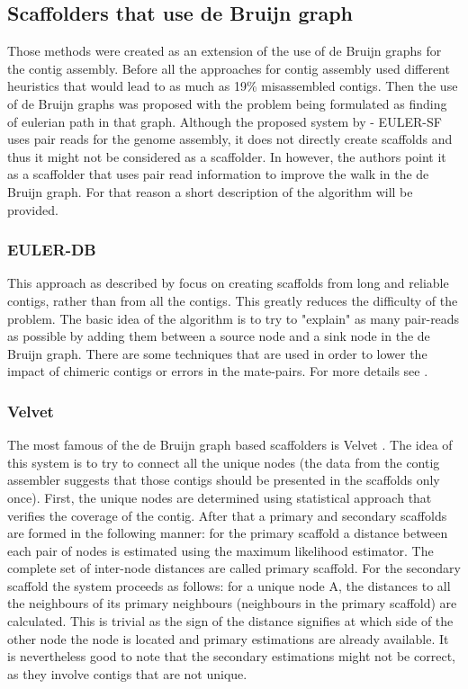 \documentclass[11pt]{article}
\begin{document}
\subsection{Scaffolders that use de Bruijn graph} %
\label{sub:Scaffolders that use de Bruijn graph}
Those methods were created as an extension of the use of de Bruijn graphs for
the contig assembly. Before \cite{pevzner} all the approaches for contig
assembly used different heuristics that would lead to as much as 19\%
misassembled contigs. Then the use of de Bruijn graphs was proposed with
the problem being formulated as finding of eulerian path in that graph. Although
the proposed system by \cite{pevzner} - EULER-SF uses pair reads for the genome
assembly, it does not directly create scaffolds and thus it might not be
considered as a scaffolder. In \cite{SOPRA} however, the authors point it as a
scaffolder that uses pair read information to improve the walk in the de Bruijn
graph. For that reason a short description of the algorithm will be provided.

\subsubsection{EULER-DB} %
\label{ssub:EULER-DB}
This approach as described by \cite{pevzner} focus on creating scaffolds from
long and reliable contigs, rather than from all the contigs. This greatly
reduces the difficulty of the problem. The basic idea of the algorithm is to try
to "explain" as many pair-reads as possible by adding them between a source node
and a sink node in the de Bruijn graph. There are some techniques that are used
in order to lower the impact of chimeric contigs or errors in the mate-pairs.
For more details see \cite{pevzner}.


\subsubsection{Velvet} %
\label{ssub:Velvet}
The most famous of the de Bruijn graph based scaffolders is Velvet
\cite{velvet-scaffolding}. The idea of this system is to try to connect all the
unique nodes (the data from the contig assembler suggests that those contigs
should be presented in the scaffolds only once). First, the unique nodes are
determined using statistical approach that verifies the coverage of the contig.
After that a primary and secondary scaffolds are formed in the following manner:
for the primary scaffold a distance between each pair of nodes is estimated
using the maximum likelihood estimator. The complete set of inter-node distances
are called primary scaffold. For the secondary scaffold the system proceeds as
follows: for a unique node A, the distances to all the neighbours of its primary
neighbours (neighbours in the primary scaffold) are calculated. This is trivial
as the sign of the distance signifies at which side of the other node the node
is located and primary estimations are already available. It is nevertheless
good to note that the secondary estimations might not be correct, as they
involve contigs that are not unique.
\end{document}
